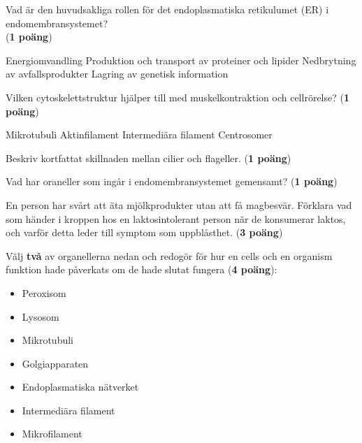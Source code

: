 \documentclass{exam}
\begin{document}
\begin{questions}
\vspace{10mm}

\question Vad är den huvudsakliga rollen för det endoplasmatiska retikulumet (ER) i endomembransystemet? \\(\textbf{1 poäng})
\vspace{5mm}
\begin{checkboxes}
    \choice Energiomvandling
    \choice Produktion och transport av proteiner och lipider
    \choice Nedbrytning av avfallsprodukter
    \choice Lagring av genetisk information
\end{checkboxes}

\vspace{10mm}

\question Vilken cytoskelettstruktur hjälper till med muskelkontraktion och cellrörelse? (\textbf{1 poäng})
\vspace{5mm}
\begin{checkboxes}
    \choice Mikrotubuli
    \choice Aktinfilament
    \choice Intermediära filament
    \choice Centrosomer
\end{checkboxes}

\vspace{10mm}

\question
Beskriv kortfattat skillnaden mellan cilier och flageller. (\textbf{1 poäng})
\vspace{20mm}

\vspace{10mm}

\question
Vad har oraneller som ingår i endomembransystemet gemensamt? (\textbf{1 poäng})
\vspace{20mm}

\break



\vspace{5mm} %
\begin{center}
\end{center}


\question
En person har svårt att äta mjölkprodukter utan att få magbesvär. Förklara vad som händer i kroppen hos en laktosintolerant person när de konsumerar laktos, och varför detta leder till symptom som uppblåsthet. (\textbf{3 poäng})
\vspace{60mm}

\question
Välj \textbf{två} av organellerna nedan och redogör för hur en cells och en organism funktion hade påverkats om de hade slutat fungera (\textbf{4 poäng}):
\begin{itemize}
  \item Peroxisom
  \item Lysosom
  \item Mikrotubuli
  \item Golgiapparaten
  \item Endoplasmatiska nätverket
  \item Intermediära filament
  \item Mikrofilament
\end{itemize}


\end{questions}
\end{document}

